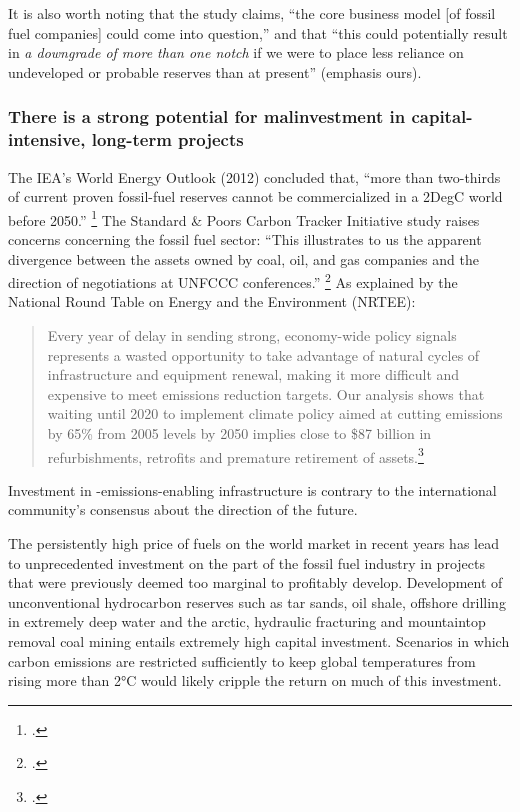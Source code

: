 It is also worth noting that the study claims, ``the core business model [of fossil fuel companies] could come into question,'' and that ``this could potentially result in \emph{a downgrade of more than one notch} if we were to place less reliance on undeveloped or probable reserves than at present'' (emphasis ours).



	\subsubsection {There is a strong potential for malinvestment in capital-intensive, long-term projects}



The IEA's World Energy Outlook (2012) concluded that, ``more than two-thirds of current proven fossil-fuel reserves cannot be commercialized in a 2DegC world before 2050.'' \footcite{IEA2012}
The Standard \& Poors Carbon Tracker Initiative study raises concerns concerning the fossil fuel sector: ``This illustrates to us the apparent divergence between the assets owned by coal, oil, and gas companies and the direction of negotiations at UNFCCC conferences.'' \footcite{SandPConstrained}
As explained by the National Round Table on Energy and the Environment (NRTEE):
\begin{quote}
Every year of delay in sending strong, economy-wide policy signals represents a wasted opportunity to take advantage of natural cycles of infrastructure and equipment renewal, making it more difficult and expensive to meet emissions reduction targets. Our analysis shows that waiting until 2020 to implement climate policy aimed at cutting emissions by 65\% from 2005 levels by 2050 implies close to \$87 billion in refurbishments, retrofits and premature retirement of assets.\footcite[][p. 19]{FramingFuture}
\end{quote}
Investment in -emissions-enabling infrastructure is contrary to the international community's consensus about the direction of the future.



The persistently high price of fuels on the world market in recent years has lead to unprecedented investment on the part of the fossil fuel industry in projects that were previously deemed too marginal to profitably develop. 
Development of unconventional hydrocarbon reserves such as tar sands, oil shale, offshore drilling in extremely deep water and the arctic, hydraulic fracturing and mountaintop removal coal mining entails extremely high capital investment. 
Scenarios in which carbon emissions are restricted sufficiently to keep global temperatures from rising more than 2°C would likely cripple the return on much of this investment.



